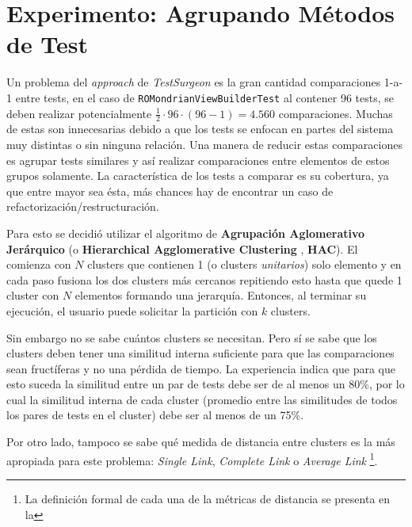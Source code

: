 
\chapter{Experimento: Agrupando Métodos de Test}

\par Un problema del \emph{approach} de \emph{TestSurgeon} es la gran cantidad  comparaciones 1-a-1 entre tests, en el caso de {\tt ROMondrianViewBuilderTest} al contener 96 tests, se deben realizar potencialmente $\frac{1}{2} \cdot 96 \cdot (96-1) = 4.560$ comparaciones. Muchas de estas son innecesarias debido a que los tests se enfocan en partes del sistema muy distintas o sin ninguna relación. Una manera de reducir estas comparaciones es agrupar tests similares y así realizar comparaciones entre elementos de estos grupos solamente. La característica de los tests a comparar es su cobertura, ya que entre mayor sea ésta, más chances hay de encontrar un caso de refactorización/restructuración. 

\par Para esto se decidió utilizar el algoritmo de \textbf{Agrupación Aglomerativo Jerárquico} (o \textbf{Hierarchical Agglomerative Clustering }, \textbf{HAC}). El comienza con $N$ clusters que contienen 1 (o clusters \textit{unitarios}) solo elemento y en cada paso fusiona los dos clusters más cercanos repitiendo esto hasta que quede 1 cluster con $N$ elementos formando una jerarquía. Entonces, al terminar su ejecución, el usuario puede solicitar la partición con $k$ clusters. 

\par Sin embargo no se sabe cuántos clusters se necesitan. Pero sí se sabe que los clusters deben tener una similitud interna suficiente para que las comparaciones sean fructíferas y no una pérdida de tiempo. La experiencia indica que para que esto suceda la similitud entre un par de tests debe ser de al menos un 80\%, por lo cual la similitud interna de cada cluster (promedio entre las similitudes de todos los pares de tests en el cluster) debe ser al menos de un 75\%. 

\par Por otro lado, tampoco se sabe qué medida de distancia entre clusters es la más apropiada para este problema: \emph{Single Link}, \emph{Complete Link} o \emph{Average Link} \footnote{La definición formal de cada una de la métricas de distancia se presenta en la }.  

